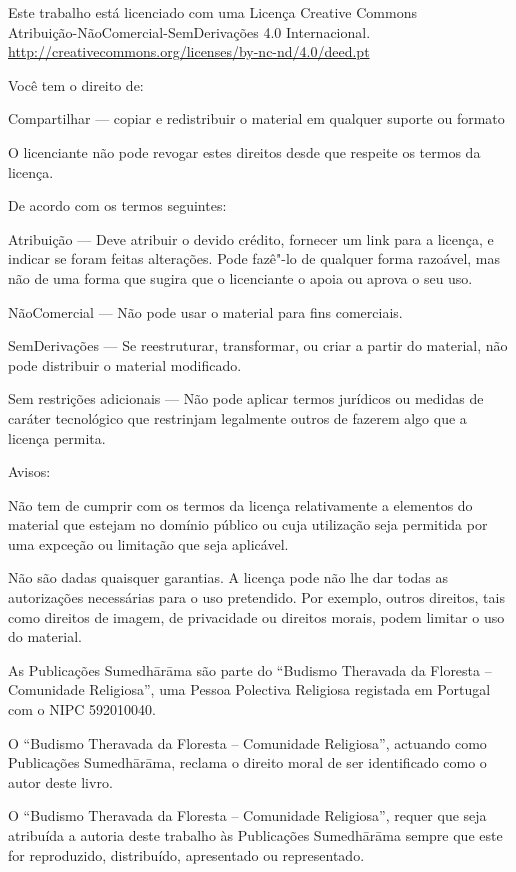 \cleartorecto
\thispagestyle{chapter}
{\copyrightsize\setlength{\parindent}{0pt}%
\raggedright\label{copyright-details}
\setlength{\parskip}{7pt}

{\centering

{\LARGE\ccbyncnd}

Este trabalho está licenciado com uma Licença Creative Commons\\
Atribuição-NãoComercial-SemDerivações 4.0 Internacional.\\
{\tiny \url{http://creativecommons.org/licenses/by-nc-nd/4.0/deed.pt}}

}

Você tem o direito de:

\begin{packeditemize}
\item Compartilhar — copiar e redistribuir o material em qualquer suporte ou formato
\end{packeditemize}

O licenciante não pode revogar estes direitos desde que respeite os termos da licença.

De acordo com os termos seguintes:

\begin{packeditemize}
\item Atribuição — Deve atribuir o devido crédito, fornecer um link para a licença, e indicar se foram feitas alterações. Pode fazê"-lo de qualquer forma razoável, mas não de uma forma que sugira que o licenciante o apoia ou aprova o seu uso.
\item NãoComercial — Não pode usar o material para fins comerciais.
\item SemDerivações — Se reestruturar, transformar, ou criar a partir do material, não pode distribuir o material modificado.
\end{packeditemize}

Sem restrições adicionais — Não pode aplicar termos jurídicos ou medidas de caráter tecnológico que restrinjam legalmente outros de fazerem algo que a licença permita.

Avisos:

Não tem de cumprir com os termos da licença relativamente a elementos do material que estejam no domínio público ou cuja utilização seja permitida por uma expceção ou limitação que seja aplicável.

Não são dadas quaisquer garantias. A licença pode não lhe dar todas as autorizações necessárias para o uso pretendido. Por exemplo, outros direitos, tais como direitos de imagem, de privacidade ou direitos morais, podem limitar o uso do material.

As Publicações Sumedhārāma são parte do ``Budismo Theravada da Floresta -- Comunidade Religiosa'', uma Pessoa Polectiva Religiosa registada em Portugal com o NIPC 592010040.

O ``Budismo Theravada da Floresta -- Comunidade Religiosa'', actuando como Publicações Sumedhārāma, reclama o direito moral de ser identiﬁcado como o autor deste livro.

O ``Budismo Theravada da Floresta -- Comunidade Religiosa'', requer que seja atribuída a autoria deste trabalho às Publicações Sumedhārāma sempre que este for reproduzido, distribuído, apresentado ou representado.

}
